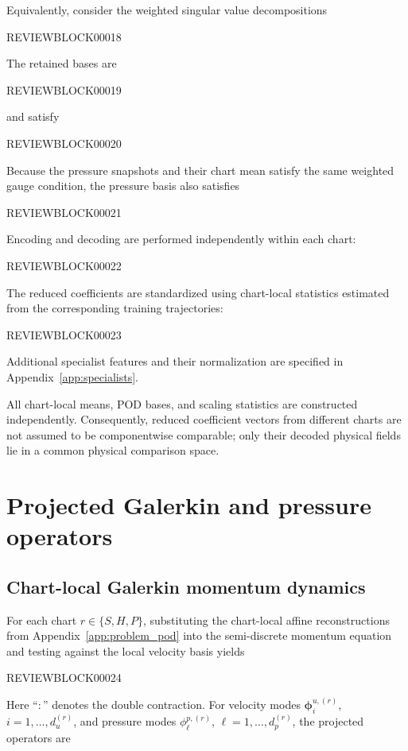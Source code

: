 \documentclass{article}
\begin{document}
Equivalently, consider the weighted singular value decompositions


REVIEWBLOCK00018


The retained bases are


REVIEWBLOCK00019


and satisfy


REVIEWBLOCK00020


Because the pressure snapshots and their chart mean satisfy the same weighted
gauge condition, the pressure basis also satisfies


REVIEWBLOCK00021



Encoding and decoding are performed independently within each chart:


REVIEWBLOCK00022



The reduced coefficients are standardized using chart-local statistics
estimated from the corresponding training trajectories:


REVIEWBLOCK00023


Additional specialist features and their normalization are specified in
Appendix~\ref{app:specialists}.

All chart-local means, POD bases, and scaling statistics are constructed
independently.
Consequently, reduced coefficient vectors from different charts are not
assumed to be componentwise comparable; only their decoded physical fields lie in a common physical comparison space.






\section{Projected Galerkin and pressure operators}
\label{app:rom}

\subsection{Chart-local Galerkin momentum dynamics}

For each chart $r\in\{S,H,P\}$, substituting the chart-local affine reconstructions
from Appendix~\ref{app:problem_pod} into the semi-discrete
momentum equation and testing against the local velocity basis yields


REVIEWBLOCK00024


Here ``$:$'' denotes the double contraction.
For velocity modes
$\bm\phi_i^{u,(r)}$,
$i=1,\ldots,d_u^{(r)}$,
and pressure modes
$\phi_\ell^{p,(r)}$,
$\ell=1,\ldots,d_p^{(r)}$,
the projected operators are
\end{document}
